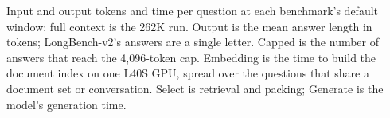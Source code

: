 \documentclass[letterpaper]{article} %
\begin{document}
\begin{table}[t]
\centering
\small

\caption{Input and output tokens and time per question at each benchmark's default window; full context is the 262K run. Output is the mean answer length in tokens; LongBench-v2's answers are a single letter. Capped is the number of answers that reach the 4,096-token cap. Embedding is the time to build the document index on one L40S GPU, spread over the questions that share a document set or conversation. Select is retrieval and packing; Generate is the model's generation time.}
\label{tab:cost}
\end{table}

% 
\end{document}
